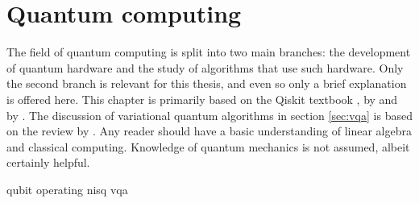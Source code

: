 \chapter{Quantum computing}
\label{chap:qc}
The field of quantum computing is split into two main branches: the development of quantum hardware and the study of algorithms that use such hardware.
Only the second branch is relevant for this thesis, and even so only a brief explanation is offered here.
This chapter is primarily based on the Qiskit textbook \cite{qiskit_textbook},  by \textcite{schuld2021a} and  by \textcite{nielsen2012}.
The discussion of variational quantum algorithms in section \ref{sec:vqa} is based on the review by \textcite{cerezo2021}.
Any reader should have a basic understanding of linear algebra and classical computing.
Knowledge of quantum mechanics is not assumed, albeit certainly helpful.

{qubit}
{operating}
{nisq}
{vqa}




